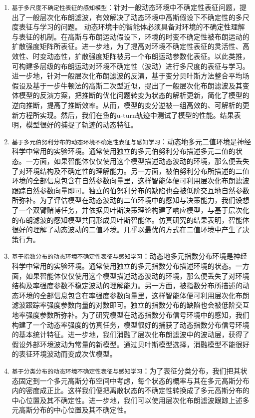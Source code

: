 \begin{enumerate}
	\item {\verb|基于多尺度不确定性表征的感知模型|}：针对一般动态环境中不确定性表征问题，提出了一般层次化布朗滤波，有效解决了动态环境中高斯假设下不确定性的多尺度表征与学习的问题。
	动态环境中的智能体必须具备对环境的不确定性理解与表征的机制。在高斯与布朗运动假设下，环境的时变不确定性被布朗运动的扩散强度矩阵所表征。进一步地，为了提高对环境不确定性表征的灵活性、高效性、时变动态性，扩散强度矩阵被另一个布朗运动参数化表征。以此类推，可构建多层级的布朗运动对环境不确定性（波动）进行多尺度的表征与学习。 
	进一步地，针对一般层次化布朗滤波的反演，基于变分贝叶斯方法整合平均场假设及基于一步牛顿法的高斯二次型近似，提出了一般层次化布朗滤波及其变体模型的反演方案，把推断的优化问题转变为状态的解析更新，简化了模型的逆向推断，提高了推断效率。从而，模型的变分逆被一组高效的、可解析的更新方程所实现。然后，我们在鱼的u-turn轨迹中测试了模型的性能。结果表明，模型很好的捕捉了轨迹的动态特征。
	\item {\verb|基于多元伯努利分布的动态环境不确定性表征与感知学习|}：动态地多元二值环境是神经科学中常用的实验环境。通常使用独立的多元伯努利分布描述多元二值的状态。一方面，如果智能体仅仅使用这个模型描述动态波动的环境，那么便丢失了对环境结构及不确定性的理解能力。另一方面，被伯努利分布所描述的二值环境的全部信息包含在自然参数向量里，这样智能体便可利用层次化布朗滤波跟踪自然参数向量即可。独立的伯努利分布的缺陷也会被低阶交互地自然参数所弥补。为了评估模型在动态波动的二值环境中的感知与决策能力，我们设想了一个双臂赌博任务，并依据贝叶斯决策理论构建了响应模型，与基于层次化的布朗滤波的感知模型共同形成贝叶斯智能体。仿真研究的结果表明，智能体很好的理解了动态波动的二值环境。几乎以最优的方式在二值环境中产生了决策行为。
	\item {\verb|基于指数分布的动态环境不确定性表征与感知学习|}：动态地多元指数分布环境是神经科学中常用的实验环境。通常使用独立的多元指数分布描述环境的状态。一方面，如果智能体仅仅使用这个模型描述动态波动的环境，那么便丢失了对环境结构及率强度参数不稳定波动的理解能力。另一方面，被指数分布所描述的动态环境的全部信息包含在率强度参数向量里，这样智能体便可利用层次化布朗滤波跟踪率强度参数向量的对数即可。独立的指数分布的缺陷也会被低阶交互地率强度参数所弥补。为了研究模型在动态指数分布信号环境中的感知，我们构建了一个动态率强度的仿真任务，模型很好的捕获了动态指数分布信号环境的基本统计特征。进一步地，我们消融了层次化布朗滤波中的波动层，获得了假设外部环境波动为常量的新模型。通过贝叶斯模型选择，消融模型不能很好的表征环境波动而变成次优模型。
	\item {\verb|基于分类分布的动态环境不确定性表征与感知学习|}：为了表征分类分布，我们把其状态固定到一个多元高斯分布空间中考虑，每个状态的概率与其在多元高斯分布内的密度成正比。这样我们便把离散状态的不确定性转换成了多元高斯分布的中心位置及其不确定性。进一步地，我们可以使用层次化布朗滤波跟踪上述多元高斯分布的中心位置及其不确定性。

\end{enumerate}

